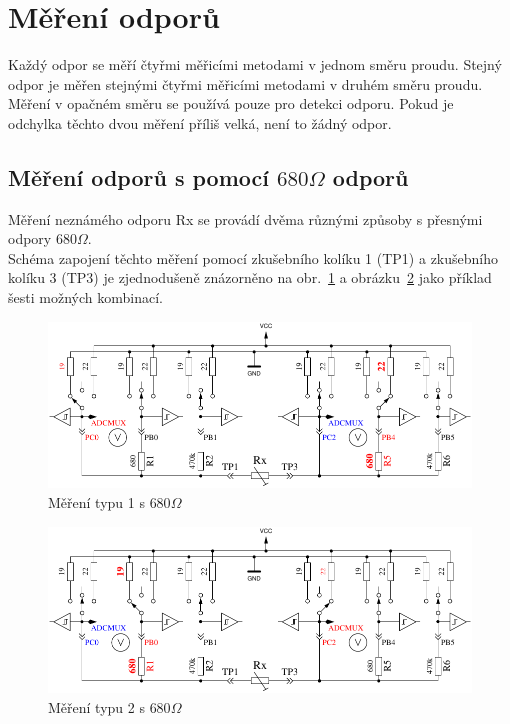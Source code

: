 \section{Měření odporů}
Každý odpor se měří čtyřmi měřicími metodami v jednom směru proudu.
Stejný odpor je měřen stejnými čtyřmi měřicími metodami v druhém směru proudu.
Měření v opačném směru se používá pouze pro detekci odporu.
Pokud je odchylka těchto dvou měření příliš velká, není to žádný odpor.

\subsection{Měření odporů s pomocí \(680\Omega\) odporů}
Měření neznámého odporu Rx se provádí dvěma různými způsoby s přesnými odpory \(680\Omega\).\\
Schéma zapojení těchto měření pomocí zkušebního kolíku 1 (TP1) a zkušebního kolíku 3 (TP3) je zjednodušeně znázorněno na obr.~\ref{fig:RL1mes} a obrázku~\ref{fig:RL2mes} jako příklad šesti možných kombinací.

\begin{figure}[H]
\centering
\includegraphics[]{../FIG/ResistormessL1.pdf}
\caption{Měření typu 1 s \(680\Omega\) }
\label{fig:RL1mes}
\end{figure}

\begin{figure}[H]
 \centering
 \includegraphics[]{../FIG/ResistormessL2.pdf}
 \caption{Měření typu 2 s \(680\Omega\) }
\label{fig:RL2mes}
\end{figure}

